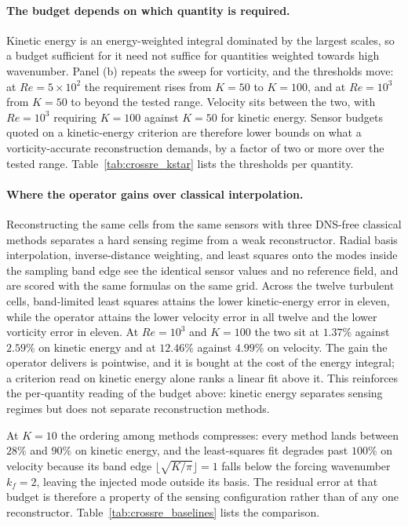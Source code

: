 \paragraph{The budget depends on which quantity is required.}
Kinetic energy is an energy-weighted integral dominated by the largest scales, so a budget sufficient for it need not suffice for quantities weighted towards high wavenumber. Panel (b) repeats the sweep for vorticity, and the thresholds move: at $Re=5\times10^{2}$ the requirement rises from $K=50$ to $K=100$, and at $Re=10^{3}$ from $K=50$ to beyond the tested range. Velocity sits between the two, with $Re=10^{3}$ requiring $K=100$ against $K=50$ for kinetic energy. Sensor budgets quoted on a kinetic-energy criterion are therefore lower bounds on what a vorticity-accurate reconstruction demands, by a factor of two or more over the tested range. Table~\ref{tab:crossre_kstar} lists the thresholds per quantity.

\paragraph{Where the operator gains over classical interpolation.}
Reconstructing the same cells from the same sensors with three DNS-free classical methods separates a hard sensing regime from a weak reconstructor. Radial basis interpolation, inverse-distance weighting, and least squares onto the modes inside the sampling band edge see the identical sensor values and no reference field, and are scored with the same formulas on the same grid. Across the twelve turbulent cells, band-limited least squares attains the lower kinetic-energy error in eleven, while the operator attains the lower velocity error in all twelve and the lower vorticity error in eleven. At $Re=10^{3}$ and $K=100$ the two sit at $1.37\%$ against $2.59\%$ on kinetic energy and at $12.46\%$ against $4.99\%$ on velocity. The gain the operator delivers is pointwise, and it is bought at the cost of the energy integral; a criterion read on kinetic energy alone ranks a linear fit above it. This reinforces the per-quantity reading of the budget above: kinetic energy separates sensing regimes but does not separate reconstruction methods.

At $K=10$ the ordering among methods compresses: every method lands between $28\%$ and $90\%$ on kinetic energy, and the least-squares fit degrades past $100\%$ on velocity because its band edge $\lfloor\sqrt{K/\pi}\rfloor = 1$ falls below the forcing wavenumber $k_f = 2$, leaving the injected mode outside its basis. The residual error at that budget is therefore a property of the sensing configuration rather than of any one reconstructor. Table~\ref{tab:crossre_baselines} lists the comparison.

